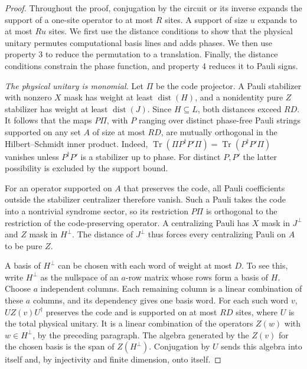 \documentclass[aps,prl,reprint,longbibliography,nofootinbib,nobibnotes]{revtex4-2}
\begin{document}
\begin{proof}
Throughout the proof, conjugation by the circuit or its inverse expands the support of a one-site
operator to at most $R$ sites. A support of size $u$ expands to at most $Ru$ sites. We first use
the distance conditions to show that the physical unitary permutes computational basis lines and
adds phases. We then use property 3 to reduce the permutation to a translation. Finally, the
distance conditions constrain the phase function, and property 4 reduces it to Pauli signs.

\emph{The physical unitary is monomial.}
Let $\Pi$ be the code projector. A Pauli stabilizer with nonzero $X$ mask has weight at least
$\operatorname{dist}(H)$, and a nonidentity pure $Z$ stabilizer has weight at least
$\operatorname{dist}(J)$. Since $H\subseteq L$, both distances exceed $RD$. It follows that the
maps $P\Pi$, with $P$ ranging over distinct phase-free Pauli strings supported on any set $A$ of
size at most $RD$, are mutually orthogonal in the Hilbert--Schmidt inner product. Indeed,
$\operatorname{Tr}(\Pi P^\dagger P'\Pi)=\operatorname{Tr}(P^\dagger P'\Pi)$ vanishes unless
$P^\dagger P'$ is a stabilizer up to phase. For distinct $P,P'$ the latter possibility is excluded
by the support bound.

For an operator supported on $A$ that preserves the code, all Pauli coefficients outside the
stabilizer centralizer therefore vanish. Such a Pauli takes the code into a nontrivial syndrome
sector, so its restriction $P\Pi$ is orthogonal to the restriction of the code-preserving operator.
A centralizing Pauli has $X$ mask in $J^\perp$ and $Z$ mask in $H^\perp$. The distance of $J^\perp$
thus forces every centralizing Pauli on $A$ to be pure $Z$.

A basis of $H^\perp$ can be chosen with each word of weight at most $D$. To see this, write
$H^\perp$ as the nullspace of an $a$-row matrix whose rows form a basis of $H$. Choose $a$
independent columns. Each remaining column is a linear combination of these $a$ columns, and its
dependency gives one basis word. For each such word $v$, $UZ(v)U^\dagger$ preserves the code and is
supported on at most $RD$ sites, where $U$ is the total physical unitary. It is a linear
combination of the operators $Z(w)$ with $w\in H^\perp$, by the preceding paragraph. The algebra
generated by the $Z(v)$ for the chosen basis is the span of $Z(H^\perp)$. Conjugation by $U$ sends
this algebra into itself and, by injectivity and finite dimension, onto itself.


\end{proof}
\end{document}
